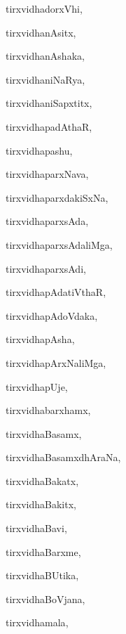 \begin{multicols}{3}
{\noindent
{tirxvidhadorxVhi}, \pageref{tirxvidhadorxVhi}

\noindent
{tirxvidhanAsitx}, \pageref{tirxvidhanAsitx}

\noindent
{tirxvidhanAshaka}, \pageref{tirxvidhanAshaka}

\noindent
{tirxvidhaniNaRya}, \pageref{tirxvidhaniNaRya}

\noindent
{tirxvidhaniSapxtitx}, \pageref{tirxvidhaniSapxtitx}

\noindent
{tirxvidhapadAthaR}, \pageref{tirxvidhapadAthaR}

\noindent
{tirxvidhapashu}, \pageref{tirxvidhapashu}

\noindent
{tirxvidhaparxNava}, \pageref{tirxvidhaparxNava}

\noindent
{tirxvidhaparxdakiSxNa}, \pageref{tirxvidhaparxdakiSxNa}

\noindent
{tirxvidhaparxsAda}, \pageref{tirxvidhaparxsAda}

\noindent
{tirxvidhaparxsAdaliMga}, \pageref{tirxvidhaparxsAdaliMga}

\noindent
{tirxvidhaparxsAdi}, \pageref{tirxvidhaparxsAdi}

\noindent
{tirxvidhapAdatiVthaR}, \pageref{tirxvidhapAdatiVthaR}

\noindent
{tirxvidhapAdoVdaka}, \pageref{tirxvidhapAdoVdaka}

\noindent
{tirxvidhapAsha}, \pageref{tirxvidhapAsha}

\noindent
{tirxvidhapArxNaliMga}, \pageref{tirxvidhapArxNaliMga}

\noindent
{tirxvidhapUje}, \pageref{tirxvidhapUje}

\noindent
{tirxvidhabarxhamx}, \pageref{tirxvidhabarxhamx}

\noindent
{tirxvidhaBasamx}, \pageref{tirxvidhaBasamx}

\noindent
{tirxvidhaBasamxdhAraNa}, \pageref{tirxvidhaBasamxdhAraNa}

\noindent
{tirxvidhaBakatx}, \pageref{tirxvidhaBakatx}

\noindent
{tirxvidhaBakitx}, \pageref{tirxvidhaBakitx}

\noindent
{tirxvidhaBavi}, \pageref{tirxvidhaBavi}

\noindent
{tirxvidhaBarxme}, \pageref{tirxvidhaBarxme}

\noindent
{tirxvidhaBUtika}, \pageref{tirxvidhaBUtika}

\noindent
{tirxvidhaBoVjana}, \pageref{tirxvidhaBoVjana}

\noindent
{tirxvidhamala}, \pageref{tirxvidhamala}

}
\end{multicols}

